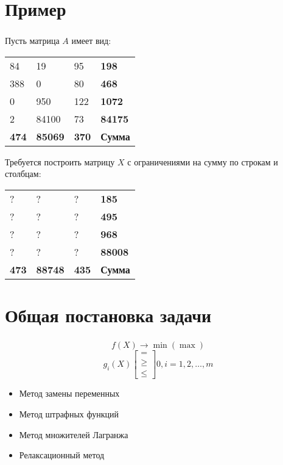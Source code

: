 \documentclass{beamer}
\begin{document}
\section{Пример}
\begin{frame}
	\frametitle{\insertsection}
	
	Пусть матрица $A$ имеет вид:
	
	\begin{center}
		\begin{tabular}{|m{2cm}|m{2cm}|m{2cm}||m{2cm}|}
			\hline
			84 & 19 & 95 & \textbf{198} \\
			388 & 0 & 80 & \textbf{468} \\
			0 & 950 & 122 & \textbf{1072} \\
			2 & 84100 & 73 & \textbf{84175} \\
			\hline
			\hline
			\textbf{474} & \textbf{85069} & \textbf{370} & \textbf{Сумма} \\
			\hline
		\end{tabular}
	\end{center}
	
	Требуется построить матрицу $X$ с ограничениями на сумму по строкам и столбцам:
	
	\begin{center}
		\begin{tabular}{|m{2cm}|m{2cm}|m{2cm}||m{2cm}|}
			\hline
			? & ? & ? & \textbf{185} \\
			? & ? & ? & \textbf{495} \\
			? & ? & ? & \textbf{968} \\
			? & ? & ? & \textbf{88008} \\
			\hline
			\hline
			\textbf{473} & \textbf{88748} & \textbf{435} & \textbf{Сумма} \\
			\hline
		\end{tabular}
	\end{center}
	
\end{frame}

\section{Общая постановка задачи}
\begin{frame}
	\frametitle{\insertsection}
	
	$$f(X) \to \min (\max)$$
	$$g_i(X)\begin{bmatrix} = \\ \geq \\ \leq \end{bmatrix} 0, i = 1, 2, \dots, m$$
	
    \begin{itemize}
	\item Метод замены переменных
	\item Метод штрафных функций
	\item Метод множителей Лагранжа
	\item Релаксационный метод
	\end{itemize}
	
\end{frame}
\end{document}
